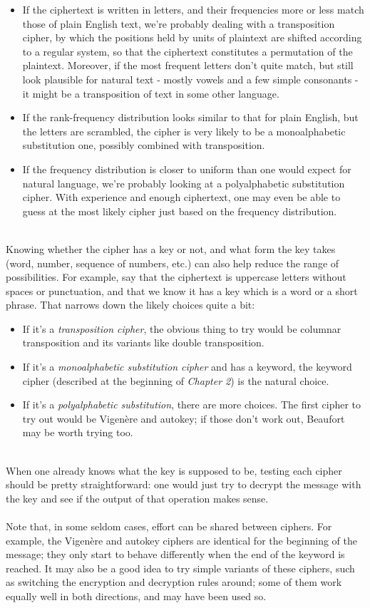 \documentclass[Lau,binding=0.6cm,oneside]{sapthesis}
\begin{document}
\begin{itemize}
	\item If the ciphertext is written in letters, and their frequencies more or less match those of plain English text, we're probably dealing with a transposition cipher, by which the positions held by units of plaintext are shifted according to a regular system, so that the ciphertext constitutes a permutation of the plaintext. Moreover, if the most frequent letters don't quite match, but still look plausible for natural text - mostly vowels and a few simple consonants - it might be a transposition of text in some other language.
	\item If the rank-frequency distribution looks similar to that for plain English, but the letters are scrambled, the cipher is very likely to be a monoalphabetic substitution one, possibly combined with transposition.
	\item If the frequency distribution is closer to uniform than one would expect for natural language, we're probably looking at a polyalphabetic substitution cipher. With experience and enough ciphertext, one may even be able to guess at the most likely cipher just based on the frequency distribution.
\end{itemize}
\ \\
Knowing whether the cipher has a key or not, and what form the key takes (word, number, sequence of numbers, etc.) can also help reduce the range of possibilities. For example, say that the ciphertext is uppercase letters without spaces or punctuation, and that we know it has a key which is a word or a short phrase. That narrows down the likely choices quite a bit:

\begin{itemize}
	\item If it's a \textit{transposition cipher}, the obvious thing to try would be columnar transposition and its variants like double transposition.
	\item If it's a \textit{monoalphabetic substitution cipher} and has a keyword, the keyword cipher (described at the beginning of \textit{Chapter 2}) is the natural choice.
	\item If it's a \textit{polyalphabetic substitution}, there are more choices. The first cipher to try out would be Vigenère and autokey; if those don't work out, Beaufort may be worth trying too.
\end{itemize}
\ \\
When one already knows what the key is supposed to be, testing each cipher should be pretty straightforward: one would just try to decrypt the message with the key and see if the output of that operation makes sense.\\\\
Note that, in some seldom cases, effort can be shared between ciphers. For example, the Vigenère and autokey ciphers are identical for the beginning of the message; they only start to behave differently when the end of the keyword is reached. It may also be a good idea to try simple variants of these ciphers, such as switching the encryption and decryption rules around; some of them work equally well in both directions, and may have been used so.
\end{document}
